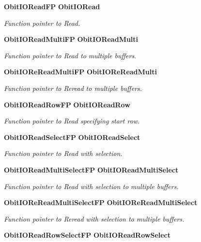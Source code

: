 \begin{CompactItemize}
{\bf Obit\-IORead\-FP} {\bf Obit\-IORead}
\begin{CompactList}\small\item\em Function pointer to Read. \item\end{CompactList}\item 
{\bf Obit\-IORead\-Multi\-FP} {\bf Obit\-IORead\-Multi}
\begin{CompactList}\small\item\em Function pointer to Read to multiple buffers. \item\end{CompactList}\item 
{\bf Obit\-IORe\-Read\-Multi\-FP} {\bf Obit\-IORe\-Read\-Multi}
\begin{CompactList}\small\item\em Function pointer to Reread to multiple buffers. \item\end{CompactList}\item 
{\bf Obit\-IORead\-Row\-FP} {\bf Obit\-IORead\-Row}
\begin{CompactList}\small\item\em Function pointer to Read specifying start row. \item\end{CompactList}\item 
{\bf Obit\-IORead\-Select\-FP} {\bf Obit\-IORead\-Select}
\begin{CompactList}\small\item\em Function pointer to Read with selection. \item\end{CompactList}\item 
{\bf Obit\-IORead\-Multi\-Select\-FP} {\bf Obit\-IORead\-Multi\-Select}
\begin{CompactList}\small\item\em Function pointer to Read with selection to multiple buffers. \item\end{CompactList}\item 
{\bf Obit\-IORe\-Read\-Multi\-Select\-FP} {\bf Obit\-IORe\-Read\-Multi\-Select}
\begin{CompactList}\small\item\em Function pointer to Reread with selection to multiple buffers. \item\end{CompactList}\item 
{\bf Obit\-IORead\-Row\-Select\-FP} {\bf Obit\-IORead\-Row\-Select}

\end{CompactItemize}
